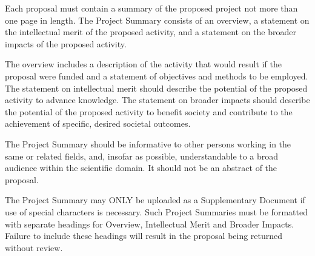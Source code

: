 %
%
%
%


\renewcommand{\title}{\noindent {{\bf Your Cool Title}}}




\ifIncludePAPPG
    \setcounter{page}{1}
    \renewcommand{\thepage} {A--\arabic{page}}
    
    \newpage
\fi

\setcounter{page}{1}
\renewcommand{\thepage} {B--\arabic{page}}
\begin{pappg}
    Each proposal must contain a summary of the proposed project not more than one page in length. The
    Project Summary consists of an overview, a statement on the intellectual merit of the proposed activity, and
    a statement on the broader impacts of the proposed activity.

    The overview includes a description of the activity that would result if the proposal were funded and a
    statement of objectives and methods to be employed. The statement on intellectual merit should describe
    the potential of the proposed activity to advance knowledge. The statement on broader impacts should
    describe the potential of the proposed activity to benefit society and contribute to the achievement of
    specific, desired societal outcomes.

    The Project Summary should be informative to other persons working in the same or related fields, and,
    insofar as possible, understandable to a broad audience within the scientific domain. It should not be an
    abstract of the proposal.

    The Project Summary may ONLY be uploaded as a Supplementary Document if use of special characters
    is necessary. Such Project Summaries must be formatted with separate headings for Overview, Intellectual
    Merit and Broader Impacts. Failure to include these headings will result in the proposal being returned
    without review.
\end{pappg}
\newpage



